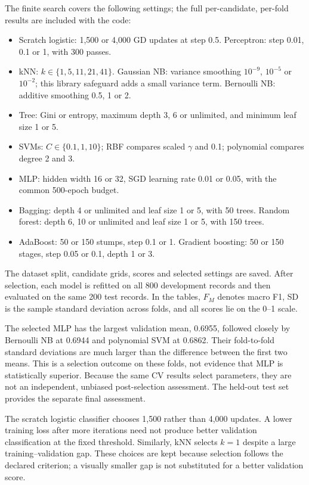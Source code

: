 The finite search covers the following settings; the full per-candidate, per-fold results are included with the code:
\begin{itemize}
\item Scratch logistic: 1,500 or 4,000 GD updates at step 0.5. Perceptron: step 0.01, 0.1 or 1, with 300 passes.
\item kNN: $k\in\{1,5,11,21,41\}$. Gaussian NB: variance smoothing $10^{-9}$, $10^{-5}$ or $10^{-2}$; this library safeguard adds a small variance term. Bernoulli NB: additive smoothing 0.5, 1 or 2.
\item Tree: Gini or entropy, maximum depth 3, 6 or unlimited, and minimum leaf size 1 or 5.
\item SVMs: $C\in\{0.1,1,10\}$; RBF compares scaled $\gamma$ and 0.1; polynomial compares degree 2 and 3.
\item MLP: hidden width 16 or 32, SGD learning rate 0.01 or 0.05, with the common 500-epoch budget.
\item Bagging: depth 4 or unlimited and leaf size 1 or 5, with 50 trees. Random forest: depth 6, 10 or unlimited and leaf size 1 or 5, with 150 trees.
\item AdaBoost: 50 or 150 stumps, step 0.1 or 1. Gradient boosting: 50 or 150 stages, step 0.05 or 0.1, depth 1 or 3.
\end{itemize}
The dataset split, candidate grids, scores and selected settings are saved. After selection, each model is refitted on all 800 development records and then evaluated on the same 200 test records. In the tables, $F_M$ denotes macro F1, SD is the sample standard deviation across folds, and all scores lie on the 0--1 scale.


The selected MLP has the largest validation mean, 0.6955, followed closely by Bernoulli NB at 0.6944 and polynomial SVM at 0.6862. Their fold-to-fold standard deviations are much larger than the difference between the first two means. This is a selection outcome on these folds, not evidence that MLP is statistically superior. Because the same CV results select parameters, they are not an independent, unbiased post-selection assessment. The held-out test set provides the separate final assessment.


The scratch logistic classifier chooses 1,500 rather than 4,000 updates. A lower training loss after more iterations need not produce better validation classification at the fixed threshold. Similarly, kNN selects $k=1$ despite a large training--validation gap. These choices are kept because selection follows the declared criterion; a visually smaller gap is not substituted for a better validation score.

